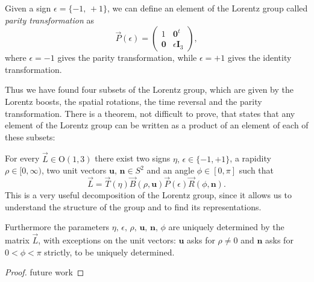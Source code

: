 \begin{definition}
    Given a sign \(\epsilon = \{-1,\,+1\}\), we can define an element of the Lorentz group called \textit{parity transformation} as
    \[
        \vec{P}(\epsilon) = \begin{pmatrix}
            1          & \mathbf{0}^t          \\
            \mathbf{0} & \epsilon \mathbf{I}_3
        \end{pmatrix},
    \]
    where \(\epsilon = -1\) gives the parity transformation, while \(\epsilon = +1\) gives the identity transformation.
\end{definition}

Thus we have found four subsets of the Lorentz group, which are given by the Lorentz boosts, the spatial rotations, the time reversal and the parity transformation. There is a theorem, not difficult to prove, that states that any element of the Lorentz group can be written as a product of an element of each of these subsets:

\begin{proposition}
    For every \(\vec{L} \in \mathrm{O}(1,3)\) there exist two signs \(\eta,\,\epsilon \in \{-1, +1\}\), a rapidity \(\rho \in [0, \infty)\), two unit vectors \(\mathbf{u},\,\mathbf{n} \in S^2\) and an angle \(\phi \in [0, \pi]\) such that
    \[
        \vec{L} = \vec{T}(\eta) \vec{B}(\rho, \mathbf{u}) \vec{P}(\epsilon) \vec{R}(\phi, \mathbf{n}).
    \]
    This is a very useful decomposition of the Lorentz group, since it allows us to understand the structure of the group and to find its representations.

    Furthermore the parameters \(\eta,\,\epsilon,\,\rho,\,\mathbf{u},\,\mathbf{n},\,\phi\) are uniquely determined by the matrix \(\vec{L}\), with exceptions on the unit vectors: \(\mathbf{u} \) asks for \(\rho \neq 0\) and \(\mathbf{n}\) asks for \(0 < \phi < \pi\) strictly, to be uniquely determined.
\end{proposition}

\begin{proof}
    future work
\end{proof}